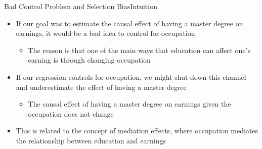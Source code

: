 \documentclass[dvipsnames,hyperref={pdfpagelabels=false}]{beamer}
\begin{document}
\begin{frame}{Bad Control Problem and Selection Bias}{Intuition}
	\begin{itemize} 
		\item If our goal was to estimate the causal effect of having a master degree on earnings, it would be a bad idea to control for occupation
		\vspace{0.2cm}
			\begin{itemize} 
		\item The reason is that one of the main ways that education can affect one's earning is through changing occupation
		\vspace{0.2cm}
			\end{itemize}
		\item If our regression controls for occupation, we might shut down this channel and underestimate the effect of having a master degree
		\vspace{0.2cm}
		\begin{itemize} 
			\item The causal effect of having a master degree on earnings given the occupation does not change
		\end{itemize}
		\vspace{0.2cm}
		\item This is related to the concept of mediation effects, where occupation mediates the relationship between education and earnings
		
	\end{itemize}
\end{frame}
\end{document}
